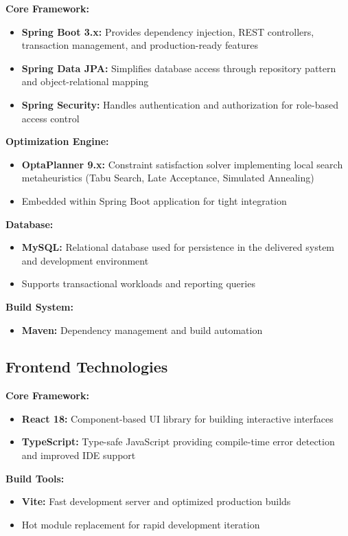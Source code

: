 \documentclass[12pt,a4paper]{report}
\begin{document}
\textbf{Core Framework:}
\begin{itemize}
    \item \textbf{Spring Boot 3.x:} Provides dependency injection, REST controllers, transaction management, and production-ready features
    \item \textbf{Spring Data JPA:} Simplifies database access through repository pattern and object-relational mapping
    \item \textbf{Spring Security:} Handles authentication and authorization for role-based access control
\end{itemize}

\textbf{Optimization Engine:}
\begin{itemize}
    \item \textbf{OptaPlanner 9.x:} Constraint satisfaction solver implementing local search metaheuristics (Tabu Search, Late Acceptance, Simulated Annealing)
    \item Embedded within Spring Boot application for tight integration
\end{itemize}

\textbf{Database:}
\begin{itemize}
    \item \textbf{MySQL:} Relational database used for persistence in the delivered system and development environment
    \item Supports transactional workloads and reporting queries
\end{itemize}

\textbf{Build System:}
\begin{itemize}
    \item \textbf{Maven:} Dependency management and build automation
\end{itemize}

\subsection{Frontend Technologies}

\textbf{Core Framework:}
\begin{itemize}
    \item \textbf{React 18:} Component-based UI library for building interactive interfaces
    \item \textbf{TypeScript:} Type-safe JavaScript providing compile-time error detection and improved IDE support
\end{itemize}

\textbf{Build Tools:}
\begin{itemize}
    \item \textbf{Vite:} Fast development server and optimized production builds
    \item Hot module replacement for rapid development iteration
\end{itemize}
\end{document}
